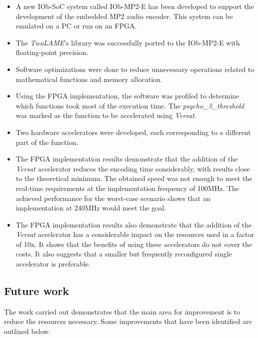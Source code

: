 \begin{itemize} 

\item A new IOb-SoC system called IOb-MP2-E has been developed to support the development of the embedded MP2 audio encoder. This system can be emulated on a PC or run on an FPGA.

\item The \textit{TwoLAME}'s library was successfully ported to the IOb-MP2-E with floating-point precision.

\item Software optimizations were done to reduce unnecessary operations related to mathematical functions and memory allocation.

\item Using the FPGA implementation, the software was profiled to determine which functions took most of the execution time. The \textit{psycho\_3\_threshold} was marked as the function to be accelerated using \textit{Versat}.

\item Two hardware accelerators were developed, each corresponding to a different part of the function.

\item The FPGA implementation results demonstrate that the addition of the \textit{Versat} accelerator reduces the encoding time considerably, with results close to the theoretical minimum. The obtained speed was not enough to meet the real-time requirements at the implementation frequency of 100MHz. The achieved performance for the worst-case scenario shows that an implementation at 240MHz would meet the goal.

\item The FPGA implementation results also demonstrate that the addition of the \textit{Versat} accelerator has a considerable impact on the resources used in a factor of 10x. It shows that the benefits of using these accelerators do not cover the costs. It also suggests that a smaller but frequently reconfigured single accelerator is preferable.

\end{itemize} 

\subsection{Future work}

The work carried out demonstrates that the main area for improvement is to reduce the resources necessary. Some improvements that have been identified are outlined below.


